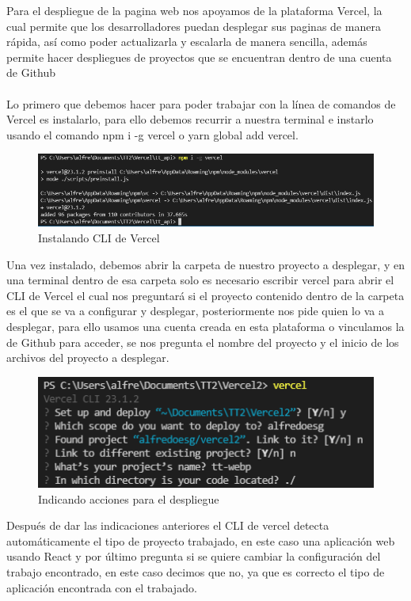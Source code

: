 \documentclass[12pt, a4paper, titlepage]{article}
\begin{document}
	Para el despliegue de la pagina web nos apoyamos de la plataforma Vercel, la cual permite que los desarrolladores puedan desplegar sus paginas de manera rápida, así como poder actualizarla y escalarla de manera sencilla, además permite hacer despliegues de proyectos que se encuentran dentro de una cuenta de Github\\\\
	Lo primero que debemos hacer para poder trabajar con la línea de comandos de Vercel es instalarlo, para ello debemos recurrir a nuestra terminal e instarlo usando el comando npm i -g vercel o yarn global add vercel.
	\begin{figure}[H]
		\includegraphics[width=12cm]{./Imagenes/Despliegue/Instalacion.png}
		\centering 
		\caption{Instalando CLI de Vercel}
	\end{figure}
	Una vez instalado, debemos abrir la carpeta de nuestro proyecto a desplegar, y en una terminal dentro de esa carpeta solo es necesario escribir vercel para abrir el CLI de Vercel el cual nos preguntará si el proyecto contenido dentro de la carpeta es el que se va a configurar y desplegar, posteriormente nos pide quien lo va a desplegar, para ello usamos una cuenta creada en esta plataforma o vinculamos la de Github para acceder, se nos pregunta el nombre del proyecto y el inicio de los archivos del proyecto a desplegar.
	\begin{figure}[H]
		\includegraphics[width=12cm]{./Imagenes/Despliegue/Acciones.png}
		\centering 
		\caption{Indicando acciones para el despliegue}
	\end{figure}
	Después de dar las indicaciones anteriores el CLI de vercel detecta automáticamente el tipo de proyecto trabajado, en este caso una aplicación web usando React y por último pregunta si se quiere cambiar la configuración del trabajo encontrado, en este caso decimos que no, ya que es correcto el tipo de aplicación encontrada con el trabajado.
\end{document}
